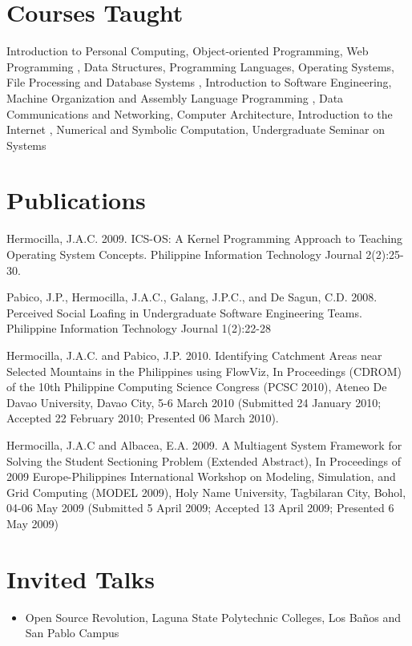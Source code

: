 \documentclass[overlapped,line,letterpaper]{res}
\begin{document}
\begin{resume}
\section{\bf Courses Taught}
Introduction to Personal Computing, Object-oriented Programming, Web Programming
, Data Structures, Programming Languages, Operating Systems, File Processing and Database Systems
, Introduction to Software Engineering, Machine Organization and Assembly Language Programming
, Data Communications and Networking, Computer Architecture, Introduction to the Internet
, Numerical and Symbolic Computation, Undergraduate Seminar on Systems

\section{\bf Publications}
Hermocilla, J.A.C. 2009. ICS-OS: A Kernel Programming Approach to Teaching Operating System Concepts. Philippine Information Technology Journal 2(2):25-30.

Pabico, J.P., Hermocilla, J.A.C., Galang, J.P.C., and De Sagun, C.D. 2008. Perceived Social Loafing in Undergraduate Software Engineering Teams. Philippine Information Technology Journal 1(2):22-28

Hermocilla, J.A.C. and Pabico, J.P. 2010. Identifying Catchment Areas near Selected Mountains in the Philippines using FlowViz, In Proceedings (CDROM) of the 10th Philippine Computing Science Congress (PCSC 2010), Ateneo De Davao University, Davao City, 5-6 March 2010 (Submitted 24 January 2010; Accepted 22 February 2010; Presented 06 March 2010).

Hermocilla, J.A.C and Albacea, E.A. 2009. A Multiagent System Framework for Solving the Student Sectioning Problem (Extended Abstract), In Proceedings of 2009 Europe-Philippines International Workshop on Modeling, Simulation, and Grid Computing (MODEL 2009), Holy Name University, Tagbilaran City, Bohol, 04-06 May 2009 (Submitted 5 April 2009; Accepted 13 April 2009; Presented 6 May 2009)


\section{\bf Invited Talks}
\begin{itemize}
\item Open Source Revolution, Laguna State Polytechnic Colleges, Los Ba\~{n}os and
San Pablo Campus
\end{itemize}


\end{resume}
\end{document}
